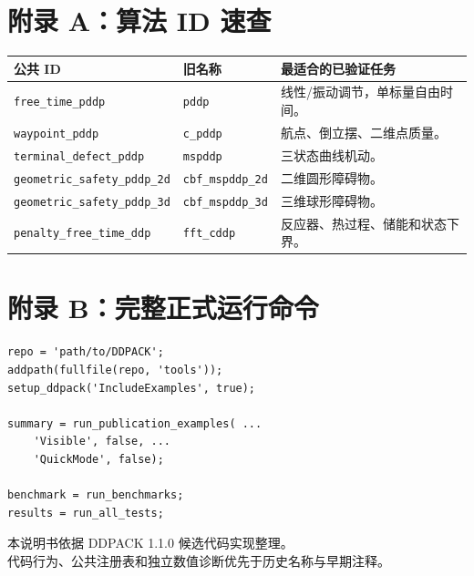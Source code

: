 \documentclass[UTF8,zihao=-4,openany,fontset=fandol]{ctexbook}
\newcommand{\code}[1]{\nolinkurl{#1}}
\begin{document}
\backmatter

\chapter*{附录 A：算法 ID 速查}

\begin{longtable}{p{}p{}p{}}
\toprule
公共 ID & 旧名称 & 最适合的已验证任务\\
\midrule
\endhead
\code{free_time_pddp} & \code{pddp} & 线性/振动调节，单标量自由时间。\\
\code{waypoint_pddp} & \code{c_pddp} & 航点、倒立摆、二维点质量。\\
\code{terminal_defect_pddp} & \code{mspddp} & 三状态曲线机动。\\
\code{geometric_safety_pddp_2d} & \code{cbf_mspddp_2d} & 二维圆形障碍物。\\
\code{geometric_safety_pddp_3d} & \code{cbf_mspddp_3d} & 三维球形障碍物。\\
\code{penalty_free_time_ddp} & \code{fft_cddp} & 反应器、热过程、储能和状态下界。\\
\bottomrule
\end{longtable}

\chapter*{附录 B：完整正式运行命令}

\begin{lstlisting}
repo = 'path/to/DDPACK';
addpath(fullfile(repo, 'tools'));
setup_ddpack('IncludeExamples', true);

summary = run_publication_examples( ...
    'Visible', false, ...
    'QuickMode', false);

benchmark = run_benchmarks;
results = run_all_tests;
\end{lstlisting}

\vfill
\begin{center}
\color{gray}
本说明书依据 DDPACK 1.1.0 候选代码实现整理。\\
代码行为、公共注册表和独立数值诊断优先于历史名称与早期注释。
\end{center}
\end{document}
